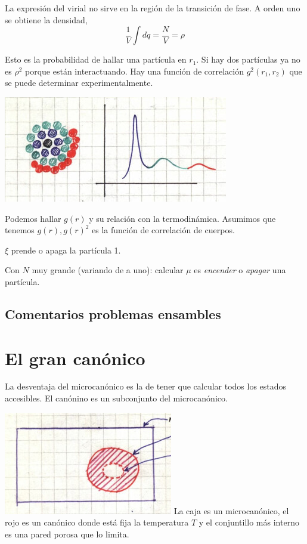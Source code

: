 \documentclass[10pt,oneside]{CBFT_book}
\begin{document}
La expresión del virial no sirve en la región de la transición de fase.
A orden uno se obtiene la densidad,
\[
	\frac{1}{V} \int dq = \frac{N}{V} = \rho 
\]

Esto es la probabilidad de hallar una partícula en $r_1$. Si hay dos partículas ya no es $\rho^2$ porque
están interactuando. Hay una función de correlación $g^2(r_1,r_2)$ que se puede determinar experimentalmente.


\includegraphics[scale=0.5]{images/1606329384.jpg} 

Podemos hallar $g(r)$ y su relación con la termodinámica. Asumimos que tenemos $g(r), g(r)^2$ es la función
de correlación de cuerpos.

$\xi$ prende o apaga la partícula 1.

Con $N$ muy grande (variando de a uno): calcular $\mu$ es \textit{encender} o \textit{apagar} una partícula.

\subsection{Comentarios problemas ensambles}

\section{El gran canónico}

La desventaja del microcanónico es la de tener que calcular todos los estados accesibles.
El canónino es un subconjunto del microcanónico.

\includegraphics[scale=0.5]{images/1606329345.jpg} 
La caja es un microcanónico, el rojo es un canónico donde está fija la temperatura $T$ y el
conjuntillo más interno es una pared porosa que lo limita.
\end{document}
